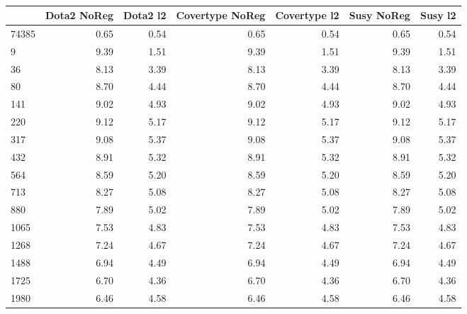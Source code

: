 \begin{table}
\centering
\caption{}
\label{}
\begin{tabular}{lrrrrrr}
\toprule
{} &  Dota2 NoReg &  Dota2 l2 &  Covertype NoReg &  Covertype l2 &  Susy NoReg &  Susy l2 \\
\midrule
74385 &         0.65 &      0.54 &             0.65 &          0.54 &        0.65 &     0.54 \\
9     &         9.39 &      1.51 &             9.39 &          1.51 &        9.39 &     1.51 \\
36    &         8.13 &      3.39 &             8.13 &          3.39 &        8.13 &     3.39 \\
80    &         8.70 &      4.44 &             8.70 &          4.44 &        8.70 &     4.44 \\
141   &         9.02 &      4.93 &             9.02 &          4.93 &        9.02 &     4.93 \\
220   &         9.12 &      5.17 &             9.12 &          5.17 &        9.12 &     5.17 \\
317   &         9.08 &      5.37 &             9.08 &          5.37 &        9.08 &     5.37 \\
432   &         8.91 &      5.32 &             8.91 &          5.32 &        8.91 &     5.32 \\
564   &         8.59 &      5.20 &             8.59 &          5.20 &        8.59 &     5.20 \\
713   &         8.27 &      5.08 &             8.27 &          5.08 &        8.27 &     5.08 \\
880   &         7.89 &      5.02 &             7.89 &          5.02 &        7.89 &     5.02 \\
1065  &         7.53 &      4.83 &             7.53 &          4.83 &        7.53 &     4.83 \\
1268  &         7.24 &      4.67 &             7.24 &          4.67 &        7.24 &     4.67 \\
1488  &         6.94 &      4.49 &             6.94 &          4.49 &        6.94 &     4.49 \\
1725  &         6.70 &      4.36 &             6.70 &          4.36 &        6.70 &     4.36 \\
1980  &         6.46 &      4.58 &             6.46 &          4.58 &        6.46 &     4.58 \\
\bottomrule
\end{tabular}
\end{table}
